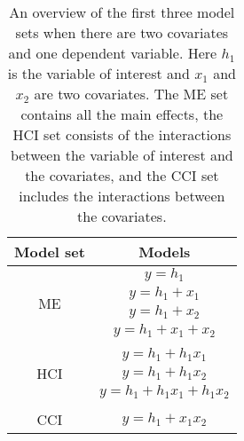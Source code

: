 \begin{table}[]
\caption{}
\caption*{\footnotesize An overview of the first three model sets when there are two covariates and one dependent variable. Here $h_1$ is the variable of interest and $x_1$ and $x_2$ are two covariates. The ME set contains all the main effects, the HCI set consists of the interactions between the variable of interest and the covariates, and the CCI set includes the interactions between the covariates.}
\centering
\begin{tabular}{cc}
\toprule
Model set & Models \\ 
\midrule
\multirow{4}{*}{ME} & $y=h_1$ \\ & $y=h_1+x_1$ \\ & $y=h_1+x_2$ \\ & $y=h_1+x_1+x_2$  \\ & \\
\multirow{3}{*}{HCI} & $y=h_1+h_1x_1$ \\ & $y=h_1+h_1x_2$ \\ & $y=h_1+h_1x_1+h_1x_2$  \\& \\
CCI & $y=h_1+x_1x_2$ \\ 
\bottomrule
\end{tabular}
\end{table}



